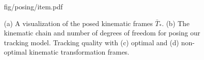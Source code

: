 \begin{figure}[t!]
\centering
\begin{overpic} 
[width=\linewidth]
{fig/posing/item.pdf}
\end{overpic}
\caption{
% 
% 
(a) A visualization of the posed kinematic frames ${\bar{T}}_*$.
(b) The kinematic chain and number of degrees of freedom for posing our tracking model.
Tracking quality with (c) optimal and (d) non-optimal kinematic transformation frames. 
% 
% 
}
\label{fig:posing}
\end{figure}